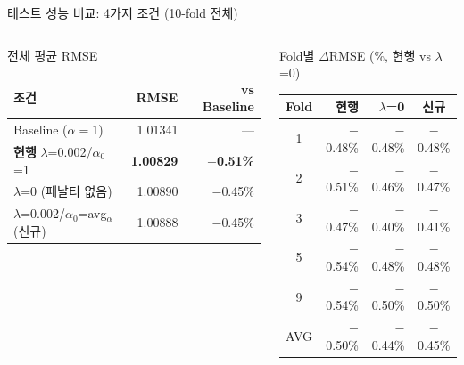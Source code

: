 \documentclass[aspectratio=169,10pt]{beamer}
\begin{document}
\begin{frame}[shrink=5]{테스트 성능 비교: 4가지 조건 (10-fold 전체)}
	\begin{columns}[T]
			\begin{block}{전체 평균 RMSE}
				\begin{tabular}{lrr}
					\toprule
					조건 & RMSE & vs Baseline \\
					\midrule
					Baseline ($\alpha=1$) & 1.01341 & — \\
					\textbf{현행} $\lambda$=0.002/$\alpha_0$=1 & \textbf{1.00829} & \textbf{$-$0.51\%} \\
					$\lambda$=0 (페날티 없음) & 1.00890 & $-$0.45\% \\
					$\lambda$=0.002/$\alpha_0$=avg$_\alpha$ (신규) & 1.00888 & $-$0.45\% \\
					\bottomrule
				\end{tabular}
			\end{block}

			\begin{block}{Fold별 $\Delta$RMSE (\%, 현행 vs $\lambda$=0)}
				\small
				\begin{tabular}{crrc}
					\toprule
					Fold & 현행 & $\lambda$=0 & 신규 \\
					\midrule
					1  & $-$0.48\% & $-$0.48\% & $-$0.48\% \\
					2  & $-$0.51\% & $-$0.46\% & $-$0.47\% \\
					3  & $-$0.47\% & $-$0.40\% & $-$0.41\% \\
					5  & $-$0.54\% & $-$0.48\% & $-$0.48\% \\
					9  & $-$0.54\% & $-$0.50\% & $-$0.50\% \\
					\midrule
					AVG & $-$0.50\% & $-$0.44\% & $-$0.45\% \\
					\bottomrule
				\end{tabular}
			\end{block}


\end{columns}
\end{frame}
\end{document}
